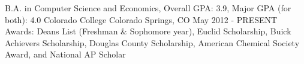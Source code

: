 


\begin{cventries}


\cventry
{B.A. in Computer Science and Economics, Overall GPA: 3.9, Major GPA (for both): 4.0} %
{Colorado College} %
{Colorado Springs, CO} %
{May 2012 - PRESENT} %
{Awards: Deans List (Freshman \& Sophomore year), Euclid Scholarship, Buick Achievers Scholarship, Douglas County Scholarship, American Chemical Society Award, and National AP Scholar}


\end{cventries}